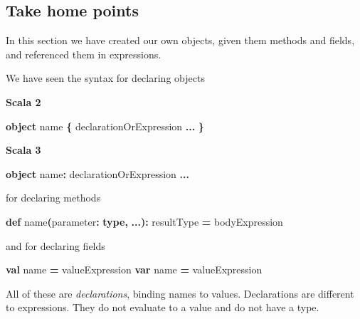 \documentclass[11pt,a5paper,]{book}
\newenvironment{Shaded}{\begin{snugshade}}{\end{snugshade}}
\newcommand{\FunctionTok}[1]{\textcolor[rgb]{0.00,0.00,0.00}{#1}}
\newcommand{\KeywordTok}[1]{\textcolor[rgb]{0.13,0.29,0.53}{\textbf{#1}}}
\newcommand{\NormalTok}[1]{#1}
\newcommand{\OperatorTok}[1]{\textcolor[rgb]{0.81,0.36,0.00}{\textbf{#1}}}
\begin{document}
\hypertarget{take-home-points-3}{%
\subsection{Take home points}\label{take-home-points-3}}

In this section we have created our own objects, given them methods and
fields, and referenced them in expressions.

We have seen the syntax for declaring objects

\textbf{Scala 2}

\begin{Shaded}
\begin{Highlighting}[]
\KeywordTok{object}\NormalTok{ name }\OperatorTok{\{}
\NormalTok{  declarationOrExpression }\OperatorTok{...}
\OperatorTok{\}}
\end{Highlighting}
\end{Shaded}

\textbf{Scala 3}

\begin{Shaded}
\begin{Highlighting}[]
\KeywordTok{object}\NormalTok{ name}\OperatorTok{:}
\NormalTok{  declarationOrExpression }\OperatorTok{...}
\end{Highlighting}
\end{Shaded}

for declaring methods

\begin{Shaded}
\begin{Highlighting}[]
\KeywordTok{def} \FunctionTok{name}\OperatorTok{(}\NormalTok{parameter}\OperatorTok{:} \KeywordTok{type}\OperatorTok{,} \OperatorTok{...):}\NormalTok{ resultType }\OperatorTok{=}\NormalTok{ bodyExpression}
\end{Highlighting}
\end{Shaded}

and for declaring fields

\begin{Shaded}
\begin{Highlighting}[]
\KeywordTok{val}\NormalTok{ name }\OperatorTok{=}\NormalTok{ valueExpression}
\KeywordTok{var}\NormalTok{ name }\OperatorTok{=}\NormalTok{ valueExpression}
\end{Highlighting}
\end{Shaded}

All of these are \emph{declarations}, binding names to values.
Declarations are different to expressions. They do not evaluate to a
value and do not have a type.
\end{document}
